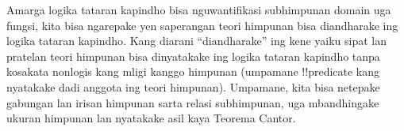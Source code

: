 \documentclass[../../../include/open-logic-section]{subfiles}
\begin{document}


Amarga logika tataran kapindho bisa nguwantifikasi
subhimpunan domain uga fungsi, kita bisa ngarepake yen
saperangan teori himpunan bisa diandharake ing logika
tataran kapindho. Kang diarani ``diandharake'' ing kene
yaiku sipat lan pratelan teori himpunan bisa dinyatakake
ing logika tataran kapindho tanpa kosakata nonlogis kang
mligi kanggo himpunan (umpamane !!{predicate}
kang nyatakake dadi anggota ing teori himpunan). Umpamane, kita bisa
netepake gabungan lan irisan himpunan sarta relasi
subhimpunan, uga mbandhingake ukuran himpunan lan
nyatakake asil kaya Teorema Cantor.
\end{document}
